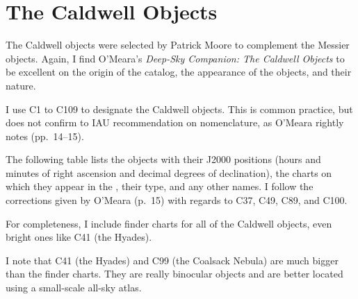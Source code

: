
\chapter{The Caldwell Objects}

The Caldwell objects were selected by Patrick Moore to complement the Messier objects. Again, I find O’Meara’s \emph{Deep-Sky Companion: The Caldwell Objects} to be excellent on the origin of the catalog, the appearance of the objects, and their nature.

I use C1 to C109 to designate the Caldwell objects. This is common practice, but does not confirm to IAU recommendation on nomenclature, as O’Meara rightly notes (pp.\ 14--15).

The following table lists the objects with their J2000 positions (hours and minutes of right ascension and decimal degrees of declination), the charts on which they appear in the {\PSA}, their type, and any other names. I follow the corrections given by O’Meara (p.\ 15) with regards to C37, C49, C89, and C100.

For completeness, I include finder charts for all of the Caldwell objects, even bright ones like C41 (the Hyades).

I note that C41 (the Hyades) and C99 (the Coalsack Nebula) are much bigger than the finder charts. They are really binocular objects and are better located using a small-scale all-sky atlas.


\clearpage

